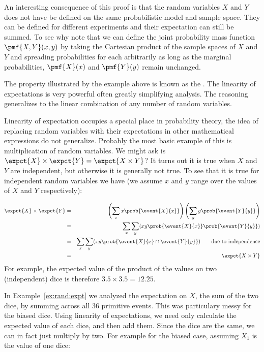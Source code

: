 {\begin{example}
An interesting consequence of this proof is that the random variables
$X$ and $Y$ does not have be defined on the same probabilistic model
and sample space.  They can be defined for different experiments and
their expectation can still be summed.  
%
To see why note that we can define the joint probability mass function
$\pmf{X,Y}(x,y)$ by taking the Cartesian product of the sample spaces
of $X$ and $Y$ and spreading probabilities for each arbitrarily as
long as the marginal probabilities, $\pmf{X}(x)$ and $\pmf{Y}(y)$
remain unchanged.
%

\end{example}

The property illustrated by the example above is known as the
.
%
The linearity of expectations is very powerful often greatly simplifying
analysis.
%
The reasoning generalizes to the linear combination of any number of
random variables.

Linearity of expectation occupies a special place in probability
theory, the idea of replacing random variables with their expectations
in other mathematical expressions do not generalize.
%
Probably the most basic example of this is multiplication of random
variables.
%
We might ask is $\expct{X} \times \expct{Y} = \expct{X \times
  Y}$?  
%
It turns out it is true when $X$ and $Y$ are independent, but
otherwise it is generally not true. 
%
To see that it is true for
independent random variables we have (we assume $x$ and $y$ range over
the values of $X$ and $Y$ respectively):

\begin{eqnarray*}
\expct{X} \times \expct{Y} & = & \left(\sum_{x} x \prob{\event{X}{x}}\right) \left(\sum_{y} y \prob{\event{Y}{y}}\right)\\
 & = & \sum_x \sum_y (x y \prob{\event{X}{x}} \prob{\event{Y}{y}}) \\
 & = & \sum_x \sum_y (x y \prob{\event{X}{x} \cap \event{Y}{y}})\mbox{~~~~~~due to independence} \\
 & = & \expct{X \times Y}
\end{eqnarray*}
For example, the expected value of the product of the values on two
(independent) dice is therefore $3.5 \times 3.5 = 12.25$.



\begin{example}
In Example~\ref{ex:rand:expt} we analyzed the expectation on $X$, the
sum of the two dice, by summing across all 36 primitive events.   This
was particulary messy for the biased dice.   Using linearity of expectations,
we need only calculate the expected value of each dice, and then add them.
Since the dice are the same, we can in fact just multiply by two.
For example for the biased case, assuming $X_1$ is the value of one dice:


\end{example}}

